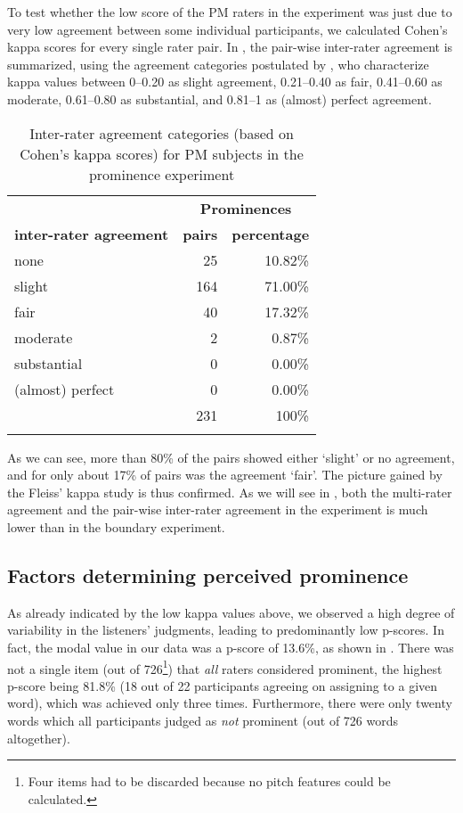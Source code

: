 \documentclass[output=paper
,modfonts
,nonflat]{langsci/langscibook}
\begin{document}
To test whether the low score of the PM raters in the  experiment was just due to very low agreement between some individual participants, we calculated Cohen’s kappa scores for every single rater pair. In , the pair-wise inter-rater agreement is summarized, using the agreement categories postulated by \citet{Landis1977}, who characterize kappa values between 0–0.20 as slight agreement, 0.21–0.40 as fair, 0.41–0.60 as moderate, 0.61–0.80 as substantial, and 0.81–1 as (almost) perfect agreement.

\begin{table}
\begin{tabularx}{\textwidth}{Xrr}
	\lsptoprule
	& \multicolumn{2}{c}{\bfseries Prominences}\\
	\bfseries inter-rater agreement & \bfseries pairs & \bfseries percentage\\
	\midrule
	none & 25 & 10.82\%\\
	slight & 164 & 71.00\%\\
	fair & 40 & 17.32\%\\
	moderate & 2 & 0.87\%\\
	substantial & 0 & 0.00\%\\
	(almost) perfect & 0 & 0.00\%\\
	\midrule
	& 231 & 100\%\\
	\lspbottomrule
\end{tabularx}
\caption{Inter-rater agreement categories (based on Cohen’s kappa scores) for PM subjects in the prominence experiment}
\label{t2}
\end{table}

\noindent
As we can see, more than 80\% of the pairs showed either ‘slight’ or no agreement, and for only about 17\% of pairs was the agreement ‘fair’. The picture gained by the Fleiss’ kappa study is thus confirmed. As we will see in , both the multi-rater agreement and the pair-wise inter-rater agreement in the  experiment is much lower than in the boundary experiment.

\subsection{\label{s:riesberg:3.2}Factors determining perceived prominence}

As already indicated by the low kappa values above, we observed a high degree of variability in the listeners’ judgments, leading to predominantly low p-scores. In fact, the modal value in our data was a p-score of 13.6\%, as shown in . There was not a single item (out of 726\footnote{Four items had to be discarded because no pitch features could be calculated.}) that \textit{all} raters considered prominent, the highest p-score being 81.8\% (18 out of 22 participants agreeing on assigning  to a given word), which was achieved only three times. Furthermore, there were only twenty words which all participants judged as \textit{not} prominent (out of 726 words altogether).
\end{document}
